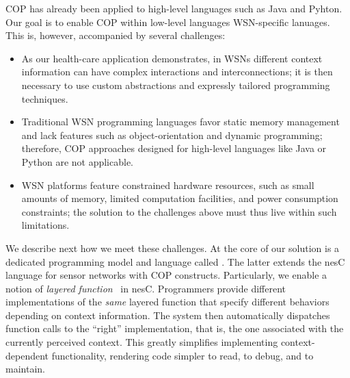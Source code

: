 COP has already been applied to high-level languages such as Java and Pyhton. Our goal is to enable COP within low-level languages WSN-specific lanuages. This is, however, accompanied by several challenges:
\begin{itemize}\compresslist
\item As our health-care application demonstrates, in WSNs
  different context information can have complex interactions and
  interconnections; it is then necessary to use custom abstractions
  and expressly tailored programming techniques.
\item Traditional WSN programming languages favor static memory
  management and lack features such as object-orientation and dynamic
  programming; therefore, COP approaches designed for high-level
  languages like Java or Python are not applicable.
\item WSN platforms feature constrained hardware resources, such as
  small amounts of memory, limited computation facilities, and power
  consumption constraints; the solution to the challenges above must
  thus live within such limitations.
\end{itemize}

We describe next how we meet these challenges. At the core of our
solution is a dedicated programming model and language called
{}. The latter extends the nesC~\cite{gay03:nesc}
language for sensor networks with COP constructs. Particularly, we
enable a notion of \emph{layered function}~\cite{hirschfeld08} in
nesC. Programmers provide different implementations of the \emph{same}
layered function that specify different behaviors depending on context
information. The system then automatically dispatches function calls
to the ``right'' implementation, that is, the one associated with the
currently perceived context. This greatly simplifies implementing
context-dependent functionality, rendering code simpler to read, to
debug, and to maintain.



